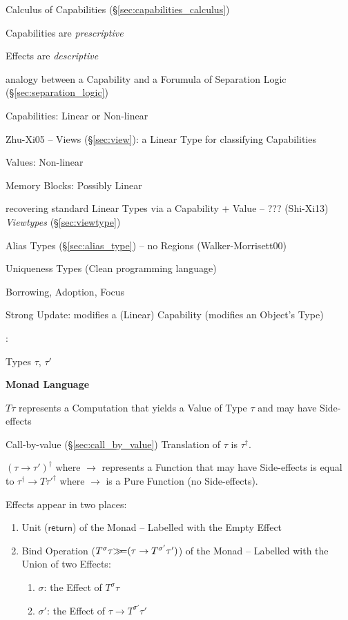 Calculus of Capabilities (\S\ref{sec:capabilities_calculus})

Capabilities are \emph{prescriptive}

Effects are \emph{descriptive}

analogy between a Capability and a Forumula of Separation Logic
(\S\ref{sec:separation_logic})

Capabilities: Linear or Non-linear

Zhu-Xi05 -- Views (\S\ref{sec:view}): a Linear Type for classifying
Capabilities

Values: Non-linear

Memory Blocks: Possibly Linear

recovering standard Linear Types via a Capability + Value --
??? (Shi-Xi13) \emph{Viewtypes} (\S\ref{sec:viewtype})

Alias Types (\S\ref{sec:alias_type}) -- no Regions
(Walker-Morrisett00)

Uniqueness Types (Clean programming language)

Borrowing, Adoption, Focus %

Strong Update: modifies a (Linear) Capability (modifies an Object's
Type)



\asterism


\cite{wadler-thiemann03}:

Types $\tau$, $\tau'$


\textbf{Monad Language}

$T \tau$ represents a Computation that yields a Value
of Type $\tau$ and may have Side-effects

Call-by-value (\S\ref{sec:call_by_value}) Translation of $\tau$ is
$\tau^\dag$.

$(\tau \rightarrow \tau')^\dag$ where $\rightarrow$ represents a
Function that may have Side-effects is equal to $\tau^\dag \rightarrow
T \tau'^\dag$ where $\rightarrow$ is a Pure Function (no Side-effects).

Effects appear in two places:
\begin{enumerate}
  \item Unit ($\mathsf{return}$) of the Monad -- Labelled with the
    Empty Effect
  \item Bind Operation ($T^\sigma\tau \mathsf{\gg\kern-3pt=} (\tau \rightarrow
    T^{\sigma'}\tau')$) of the Monad -- Labelled with the Union of two
    Effects: %
    \begin{enumerate}
      \item $\sigma$: the Effect of $T^\sigma\tau$
      \item $\sigma'$: the Effect of $\tau \rightarrow
        T^{\sigma'}\tau'$
    \end{enumerate}
\end{enumerate}

